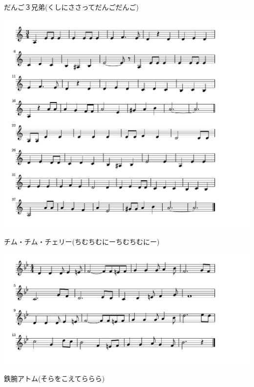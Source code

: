 \documentclass[a4paper]{ltjsarticle}
\begin{document}
\vspace{-10mm} \hspace{10mm}
だんご３兄弟(くしにささってだんごだんご)

\includegraphics[clip]{chimchimcheree_crop.pdf}

\vspace{-10mm} \hspace{10mm}
チム・チム・チェリー(ちむちむにーちむちむにー)

\includegraphics[clip]{tetsuwan_crop.pdf}

\vspace{-10mm} \hspace{10mm}
鉄腕アトム(そらをこえてららら)
\end{document}
